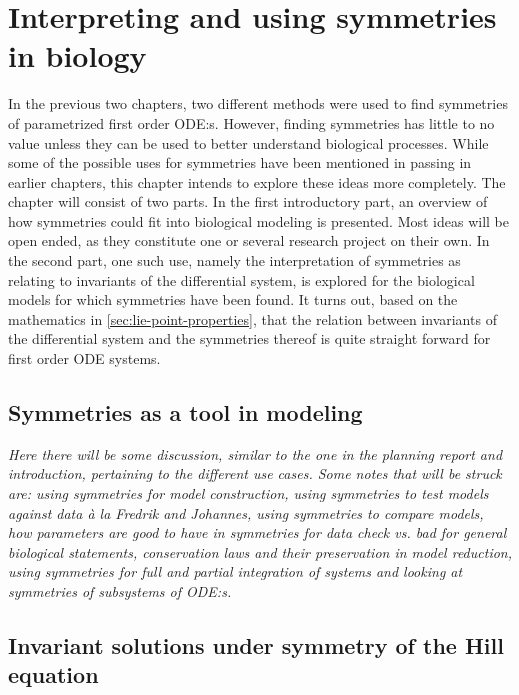\chapter{Interpreting and using symmetries in biology}

In the previous two chapters, two different methods were used to find symmetries of parametrized first order ODE:s.
However, finding symmetries has little to no value unless they can be used to better understand biological processes.
While some of the possible uses for symmetries have been mentioned in passing in earlier chapters, this chapter intends to explore these ideas more completely.
The chapter will consist of two parts.
In the first introductory part, an overview of how symmetries could fit into biological modeling is presented.
Most ideas will be open ended, as they constitute one or several research project on their own.
In the second part, one such use, namely the interpretation of symmetries as relating to invariants of the differential system, is explored for the biological models for which symmetries have been found.
It turns out, based on the mathematics in \cref{sec:lie-point-properties}, that the relation between invariants of the differential system and the symmetries thereof is quite straight forward for first order ODE systems.

\section{Symmetries as a tool in modeling}

\emph{
  Here there will be some discussion, similar to the one in the planning report and introduction, pertaining to the different use cases.
  Some notes that will be struck are: using symmetries for model construction, using symmetries to test models against data à la Fredrik and Johannes, using symmetries to compare models, how parameters are good to have in symmetries for data check vs. bad for general biological statements, conservation laws and their preservation in model reduction, using symmetries for full and partial integration of systems and looking at symmetries of subsystems of ODE:s.
}

\section{Invariant solutions under symmetry of the Hill equation}

